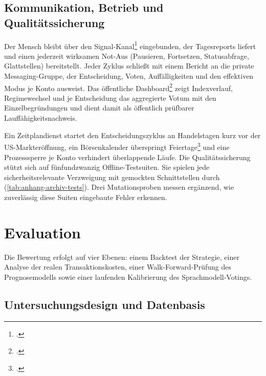 \subsection{Kommunikation, Betrieb und Qualitätssicherung}
\label{sec:umsetzung-impl-betrieb}

Der Mensch bleibt über den Signal-Kanal\footcite[vgl.][]{signalcli2026} eingebunden, der
Tagesreports liefert und einen jederzeit wirksamen Not-Aus (Pausieren, Fortsetzen,
Statusabfrage, Glattstellen) bereitstellt. Jeder Zyklus schließt mit einem Bericht an die
private Messaging-Gruppe, der Entscheidung, Voten, Auffälligkeiten und den effektiven Modus
je Konto ausweist. Das
öffentliche Dashboard\footcite[vgl.][]{chartjs2026} zeigt Indexverlauf, Regimewechsel und je
Entscheidung das aggregierte Votum mit den Einzelbegründungen und dient damit als öffentlich
prüfbarer Lauffähigkeitsnachweis.

Ein Zeitplandienst startet den Entscheidungszyklus an Handelstagen kurz vor der
US-Markteröffnung, ein Börsenkalender überspringt
Feiertage\footcite[vgl.][]{pandasMarketCalendars2026} und eine Prozesssperre je Konto
verhindert überlappende Läufe. Die Qualitätssicherung stützt sich auf fünfundzwanzig
Offline-Testsuiten. Sie spielen
jede sicherheitsrelevante Verzweigung mit gemockten Schnittstellen durch
(\cref{tab:anhang-archiv-tests}). Drei Mutationsproben messen ergänzend, wie zuverlässig
diese Suiten eingebaute Fehler erkennen.

\section{Evaluation}
\label{sec:umsetzung-evaluation}

Die Bewertung erfolgt auf vier Ebenen: einem Backtest der Strategie, einer Analyse der
realen Transaktionskosten, einer Walk-Forward-Prüfung des Prognosemodells sowie einer
laufenden Kalibrierung des Sprachmodell-Votings.

\subsection{Untersuchungsdesign und Datenbasis}
\label{sec:umsetzung-evaluation-design}

